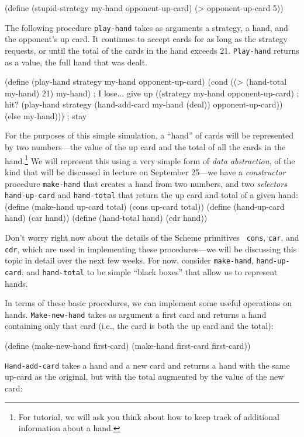 \beginlisp
(define (stupid-strategy my-hand opponent-up-card)
  (> opponent-up-card 5))
\endlisp

The following procedure {\tt play-hand} takes as arguments a strategy,
a hand, and the opponent's up card.  It continues to accept cards for
as long as the strategy requests, or until the total of the cards in
the hand exceeds 21.  {\tt Play-hand} returns as a value, the full
hand that was dealt.

\beginlisp
(define (play-hand strategy my-hand opponent-up-card)
  (cond ((> (hand-total my-hand) 21) my-hand) ; I lose... give up
        ((strategy my-hand opponent-up-card) ; hit?
         (play-hand strategy
                    (hand-add-card my-hand (deal))
                    opponent-up-card))
        (else my-hand)))                ; stay
\endlisp

For the purposes of this simple simulation, a ``hand'' of cards will
be represented by two numbers---the value of the up card and the total
of all the cards in the hand.\footnote{For tutorial, we will ask you
think about how to keep track of additional information about a hand.}
We will represent this using a very simple form of {\em data
abstraction}, of the kind that will be discussed in lecture on
September 25---we have a {\em constructor} procedure {\tt make-hand}
that creates a hand from two numbers, and two {\em selectors} {\tt
hand-up-card} and {\tt hand-total} that return the up card and total
of a given hand:
\beginlisp
(define (make-hand up-card total)
  (cons up-card total))
\null
(define (hand-up-card hand)
  (car hand))
\null
(define (hand-total hand)
  (cdr hand))
\endlisp

Don't worry right now about the details of the Scheme primitives {\tt
cons}, {\tt car}, and {\tt cdr}, which are used in implementing these
procedures---we will be discussing this topic in detail over the next
few weeks.  For now, consider {\tt make-hand}, {\tt hand-up-card}, and
{\tt hand-total} to be simple ``black boxes'' that allow us to
represent hands.

In terms of these basic procedures, we can implement some useful
operations on hands. {\tt Make-new-hand} takes as argument a first
card and returns a hand containing only that card (i.e., the card is
both the up card and the total):

\beginlisp
(define (make-new-hand first-card)
  (make-hand first-card first-card))
\endlisp

{\tt Hand-add-card} takes a hand and a new card and returns a hand with
the same up-card as the original, but with the total augmented by the
value of the new card:

